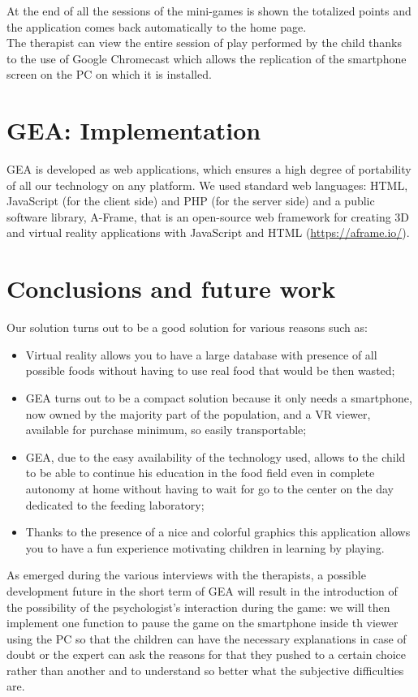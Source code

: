 \documentclass{sigchi-ext}
\begin{document}
\medskip
At the end of all the sessions of the mini-games is shown the totalized points and the application comes back automatically to the home page.\\
\medskip
The therapist can view the entire session of play performed by the child thanks to the use of Google Chromecast which allows the replication of the smartphone screen on the PC on which it is installed.


\section{GEA: Implementation}
GEA is developed as web applications, which ensures a high degree of portability of all our technology on any platform. We used standard web languages: HTML, JavaScript (for the client side) and PHP (for the server side) and a public software library, A-Frame, that is an open-source web framework for creating 3D and virtual reality applications with JavaScript and HTML (\url{https://aframe.io/}).

\section{Conclusions and future work}
Our solution turns out to be a good solution for various reasons such as:
\begin{itemize}
\item Virtual reality allows you to have a large database with presence of all possible foods without having to use real food that would be then wasted;
\item GEA turns out to be a compact solution because it only needs a smartphone, now owned by the majority
part of the population, and a VR viewer, available for purchase minimum, so easily transportable;
\item GEA, due to the easy availability of the technology used, allows to the child to be able to continue his education in the food field even in complete autonomy at home without having to wait for go to the center on the day dedicated to the feeding laboratory;
\item Thanks to the presence of a nice and colorful graphics this application allows you to have a fun experience motivating children in learning by playing.
\end{itemize}

As emerged during the various interviews with the therapists, a possible development future in the short term of GEA will result in the introduction of the possibility of the psychologist's interaction during the game: we will then implement one function to pause the game on the smartphone inside th viewer using the PC so that the children can have the necessary explanations in case of doubt or the expert can ask the reasons for that they pushed to a certain choice rather than another and to understand so better what the subjective difficulties are.\\
\end{document}
